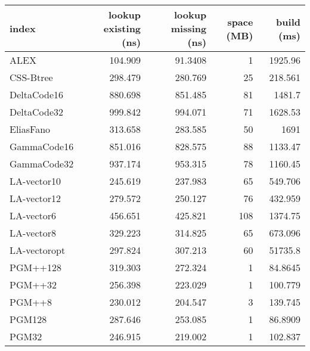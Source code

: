 \begin{tabular}{lrrrr}
\hline
 index             &   lookup existing (ns) &   lookup missing (ns) &   space (MB) &      build (ms) \\
\hline
 ALEX              &               104.909  &               91.3408 &            1 &  1925.96        \\
 CSS-Btree         &               298.479  &              280.769  &           25 &   218.561       \\
 DeltaCode16       &               880.698  &              851.485  &           81 &  1481.7         \\
 DeltaCode32       &               999.842  &              994.071  &           71 &  1628.53        \\
 EliasFano         &               313.658  &              283.585  &           50 &  1691           \\
 GammaCode16       &               851.016  &              828.575  &           88 &  1133.47        \\
 GammaCode32       &               937.174  &              953.315  &           78 &  1160.45        \\
 LA-vector10       &               245.619  &              237.983  &           65 &   549.706       \\
 LA-vector12       &               279.572  &              250.127  &           76 &   432.959       \\
 LA-vector6        &               456.651  &              425.821  &          108 &  1374.75        \\
 LA-vector8        &               329.223  &              314.825  &           65 &   673.096       \\
 LA-vectoropt      &               297.824  &              307.213  &           60 & 51735.8         \\
 PGM++128          &               319.303  &              272.324  &            1 &    84.8645      \\
 PGM++32           &               256.398  &              223.029  &            1 &   100.779       \\
 PGM++8            &               230.012  &              204.547  &            3 &   139.745       \\
 PGM128            &               287.646  &              253.085  &            1 &    86.8909      \\
 PGM32             &               246.915  &              219.002  &            1 &   102.837       \\

\end{tabular}
